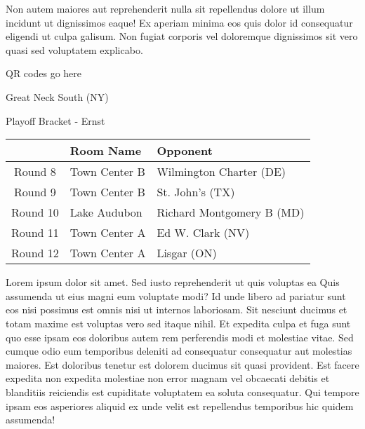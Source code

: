 \documentclass{article}%
\begin{document}
\newline%
Non autem maiores aut reprehenderit nulla sit repellendus dolore ut illum incidunt ut dignissimos eaque! Ex aperiam minima eos quis dolor id consequatur eligendi ut culpa galisum. Non fugiat corporis vel doloremque dignissimos sit vero quasi sed voluptatem explicabo.\newline%
\newline%
%
\vspace*{30pt}%
\begin{center}%
\begin{Huge}%
QR codes go here%
\end{Huge}%
\end{center}%
\newpage%
\begin{center}%
\begin{Huge}%
Great Neck South (NY)%
\end{Huge}%
\vspace*{8pt}%
\linebreak%
\begin{Large}%
Playoff Bracket {-} Ernst%
\end{Large}%
\end{center}%
\begin{tabularx}{\textwidth}{|c|Y|Y|}%
\hline%
&Room Name&Opponent\\%
\hline%
Round 8&Town Center B&Wilmington Charter (DE)\\%
Round 9&Town Center B&St. John's (TX)\\%
Round 10&Lake Audubon&Richard Montgomery B (MD)\\%
Round 11&Town Center A&Ed W. Clark (NV)\\%
Round 12&Town Center A&Lisgar (ON)\\%
\hline%
\end{tabularx}%
\vspace*{8pt}%
\linebreak%
\newline%
\newline%
Lorem ipsum dolor sit amet. Sed iusto reprehenderit ut quis voluptas ea Quis assumenda ut eius magni eum voluptate modi? Id unde libero ad pariatur sunt eos nisi possimus est omnis nisi ut internos laboriosam. Sit nesciunt ducimus et totam maxime est voluptas vero sed itaque nihil. Et expedita culpa et fuga sunt quo esse ipsam eos doloribus autem rem perferendis modi et molestiae vitae.\newline%
\newline%
Sed cumque odio eum temporibus deleniti ad consequatur consequatur aut molestias maiores. Est doloribus tenetur est dolorem ducimus sit quasi provident. Est facere expedita non expedita molestiae non error magnam vel obcaecati debitis et blanditiis reiciendis est cupiditate voluptatem ea soluta consequatur. Qui tempore ipsam eos asperiores aliquid ex unde velit est repellendus temporibus hic quidem assumenda!\newline%
\end{document}

